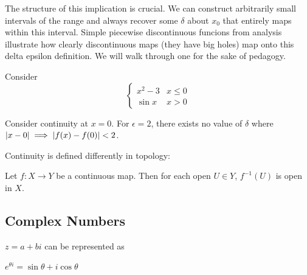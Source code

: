 \documentclass[10pt]{article}
\begin{document}
The structure of this implication is crucial. We can construct arbitrarily
small intervals of the range and always recover some $\delta$ about $x_0$ that
entirely maps within this interval. Simple piecewise discontinuous funcions
from analysis illustrate how clearly discontinuous maps (they have big holes)
map onto this delta epsilon definition. We will walk through one for the sake of
pedagogy.

\begin{example}
Consider
\[ \begin{cases} 
      x^2 - 3 & x\leq 0 \\
			\sin x & x > 0
   \end{cases}
\]

Consider continuity at $x = 0$. For $\epsilon = 2$, there exists no value of
$\delta$ where $\lvert x - 0\rvert \implies \lvert f(x) - f(0)\rvert < 2$.
\end{example}


Continuity is defined differently in topology:

\begin{definition}
	Let $f: X \to Y$ be a continuous map. Then for each open $U\in Y$,
	$f^{-1}(U)$ is open in $X$.
\end{definition}

\subsection{Complex Numbers}


$z = a + bi$ can be represented as

$e^{\theta i} = \sin\theta + i \cos\theta$
\end{document}
